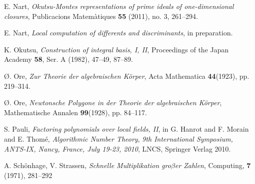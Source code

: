 \documentclass{amsart}
\begin{document}
\begin{thebibliography}{}
 E. Nart, \emph{Okutsu-Montes representations of prime ideals of one-dimensional closures}, Publicacions Matem\`atiques {\bf55} (2011), no. 3, 261--294.

 E. Nart, \emph{Local computation of differents and discriminants}, in preparation.

K. Okutsu, \emph{Construction of integral basis, I, II}, Proceedings of the Japan Academy {\bf 58}, Ser. A (1982), 47--49, 87--89.

 \O{}. Ore, \emph{Zur Theorie der algebraischen K\"orper}, Acta Mathematica {\bf44}(1923), pp. 219--314.

 \O{}. Ore, \emph{Newtonsche Polygone in der Theorie der algebraischen K\"orper}, Mathematische Annalen {\bf99}(1928), pp. 84--117.

S. Pauli, \emph{Factoring polynomials over local fields, II}, in G. Hanrot and F. Morain and E. {Thom\'e},
\emph{Algorithmic Number Theory},
\emph{9th International Symposium, ANTS-IX, Nancy, France, July 19-23, 2010},
LNCS, Springer Verlag 2010.

A. Sch\"onhage, V. Strassen,
\emph{Schnelle Multiplikation gro$\beta$er Zahlen},
Computing, \textbf{7} (1971), 281--292

\end{thebibliography}
\end{document}
